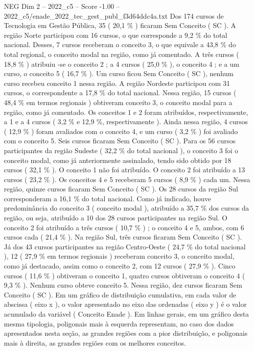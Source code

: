 \begin{textsample}{NEG Dim 2 – 2022\_c5 – Score -1.00 – 2022\_c5/enade\_2022\_tec\_gest\_publ\_f3d64ddc4a.txt}
Dos 174 cursos de Tecnologia em Gestão Pública, 35 ( 20,1 \% ) ficaram Sem Conceito ( SC ).
A região Norte participou com 16 cursos, o que corresponde a 9,2 \% do total nacional.
Desses, 7 cursos receberam o conceito 3, o que equivale a 43,8 \% do total regional, o conceito modal na região, como já comentado.
A três cursos ( 18,8 \% ) atribuiu -se o conceito 2 ; a 4 cursos ( 25,0 \% ), o conceito 4 ; e a um curso, o conceito 5 ( 16,7 \% ).
Um curso ficou Sem Conceito ( SC ), nenhum curso recebeu conceito 1 nessa região.
A região Nordeste participou com 31 cursos, o correspondente a 17,8 \% do total nacional.
Nessa região, 15 cursos ( 48,4 \% em termos regionais ) obtiveram conceito 3, o conceito modal para a região, como já comentado.
Os conceitos 1 e 2 foram atribuídos, respectivamente, a 1 e a 4 cursos ( 3,2 \% e 12,9 \%, respectivamente ).
Ainda nessa região, 4 cursos ( 12,9 \% ) foram avaliados com o conceito 4, e um curso ( 3,2 \% ) foi avaliado com o conceito 5.
Seis cursos ficaram Sem Conceito ( SC ).
Para os 56 cursos participantes da região Sudeste ( 32,2 \% do total nacional ), o conceito 3 foi o conceito modal, como já anteriormente assinalado, tendo sido obtido por 18 cursos ( 32,1 \% ).
O conceito 1 não foi atribuído.
O conceito 2 foi atribuído a 13 cursos ( 23,2 \% ).
Os conceitos 4 e 5 receberam 5 cursos ( 8,9 \% ) cada um.
Nessa região, quinze cursos ficaram Sem Conceito ( SC ).
Os 28 cursos da região Sul corresponderam a 16,1 \% do total nacional.
Como já indicado, houve predominância do conceito 3 ( conceito modal ), atribuído a 35,7 \% dos cursos da região, ou seja, atribuído a 10 dos 28 cursos participantes na região Sul.
O conceito 2 foi atribuído a três cursos ( 10,7 \% ) ; o conceito 4 e 5, ambos, com 6 cursos cada ( 21,4 \% ).
Na região Sul, três cursos ficaram Sem Conceito ( SC ).
Já dos 43 cursos participantes na região Centro-Oeste ( 24,7 \% do total nacional ), 12 ( 27,9 \% em termos regionais ) receberam conceito 3, o conceito modal, como já destacado, assim como o conceito 2, com 12 cursos ( 27,9 \% ).
Cinco cursos ( 11,6 \% ) obtiveram o conceito 1, quatro cursos obtiveram o conceito 4 ( 9,3 \% ).
Nenhum curso obteve conceito 5.
Nessa região, dez cursos ficaram Sem Conceito ( SC ).
Em um gráfico de distribuição cumulativa, em cada valor de abscissa ( eixo x ), o valor apresentado no eixo das ordenadas ( eixo y ) é o valor acumulado da variável ( Conceito Enade ).
Em linhas gerais, em um gráfico desta mesma tipologia, poligonais mais à esquerda representam, no caso dos dados apresentados nesta seção, as grandes regiões com a pior distribuição, e poligonais mais à direita, as grandes regiões com os melhores conceitos.

\end{textsample}
